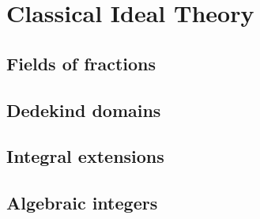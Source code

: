 \chapter{Classical Ideal Theory}

\section{Fields of fractions}


\section{Dedekind domains}


\section{Integral extensions}


\section{Algebraic integers}

